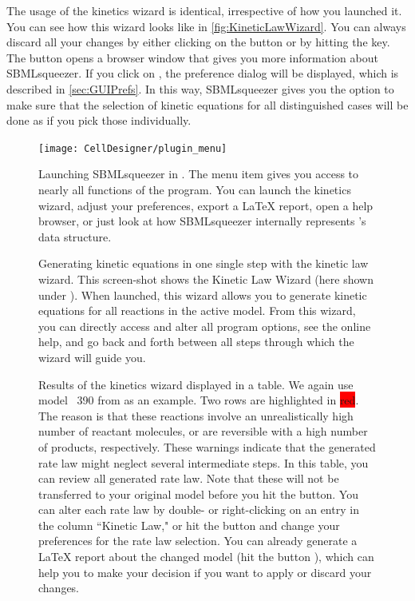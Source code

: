 The usage of the kinetics wizard is identical, irrespective of how you launched it.
You can see how this wizard looks like in \vref{fig:KineticLawWizard}.
You can always discard all your changes by either clicking on the  button or by hitting the \keys{\escwin} key.
The  button opens a browser window that gives you more information about SBMLsqueezer.
If you click on , the preference dialog will be displayed, which is described in \vref{sec:GUIPrefs}.
In this way, SBMLsqueezer gives you the option to make sure that the selection of kinetic equations for all distinguished cases will be done as if you pick those individually.
\begin{figure}
\texttt{[image: CellDesigner/plugin\_menu]}
\caption[Launching SBMLsqueezer in \CellDesigner]{Launching SBMLsqueezer in \CellDesigner.
The menu item  gives you access to nearly all functions of the program.
You can launch the kinetics wizard, adjust your preferences, export a \LaTeX{} report, open a help browser, or just look at how SBMLsqueezer internally represents \CellDesigner's data structure.}
\label{fig:PluginMenu}
\end{figure}
\begin{figure}[b!]
\caption[Generating kinetic equations in one single step with the kinetic law wizard]{Generating kinetic equations in one single step with the kinetic law wizard.
This screen-shot shows the Kinetic Law Wizard (here shown under \MacOSX).
When launched, this wizard allows you to generate kinetic equations for all reactions in the active model.
From this wizard, you can directly access and alter all program options, see the online help, and go back and forth between all steps through which the wizard will guide you.}
\label{fig:KineticLawWizard}
\end{figure}
\begin{figure}[t!]
\caption[Results of the kinetics wizard displayed in a table]{Results of the kinetics wizard displayed in a table.
We again use model \numero~390 from \BioModels \citep{Li2010a, Arnold2011} as an example.
Two rows are highlighted in \colorbox{red}{red}.
The reason is that 
these reactions involve an unrealistically high number of reactant molecules, or are reversible with a high number of products, respectively.
These warnings indicate that the generated rate law might neglect several intermediate steps.
In this table, you can review all generated rate law.
Note that these will not be transferred to your original model before you hit the  button.
You can alter each rate law by double- or right-clicking on an entry in the column ``Kinetic Law," or hit the  button and change your preferences for the rate law selection.
You can already generate a \LaTeX{} report about the changed model (hit the button ), which can help you to make your decision if you want to apply or discard your changes.}
\label{fig:wizard_results_table}
\end{figure}
